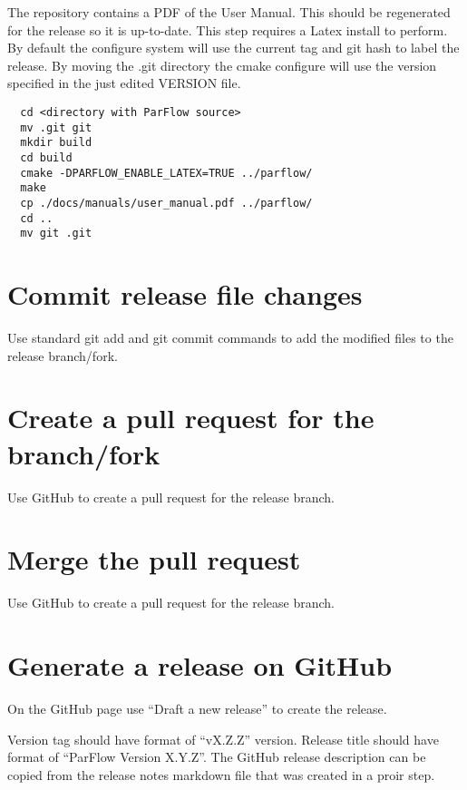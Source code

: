 The repository contains a PDF of the User Manual.  This should be
regenerated for the release so it is up-to-date.  This step requires a
Latex install to perform.  By default the configure system will use
the current tag and git hash to label the release.  By moving the .git
directory the cmake configure will use the version specified in the
just edited VERSION file.

\begin{display}\begin{verbatim}
  cd <directory with ParFlow source>
  mv .git git
  mkdir build
  cd build
  cmake -DPARFLOW_ENABLE_LATEX=TRUE ../parflow/
  make
  cp ./docs/manuals/user_manual.pdf ../parflow/
  cd ..
  mv git .git
\end{verbatim}\end{display}
  
\section{Commit release file changes}

Use standard git add and git commit commands to add the modified files
to the release branch/fork.

\section{Create a pull request for the branch/fork}

Use GitHub to create a pull request for the release branch.
  
\section{Merge the pull request}

Use GitHub to create a pull request for the release branch.
  
\section{Generate a release on GitHub}

On the GitHub  page use
``Draft a new release'' to create the release.

Version tag should have format of ``vX.Z.Z'' version.  Release title
should have format of ``ParFlow Version X.Y.Z''.  The GitHub release
description can be copied from the release notes markdown file that
was created in a proir step.
